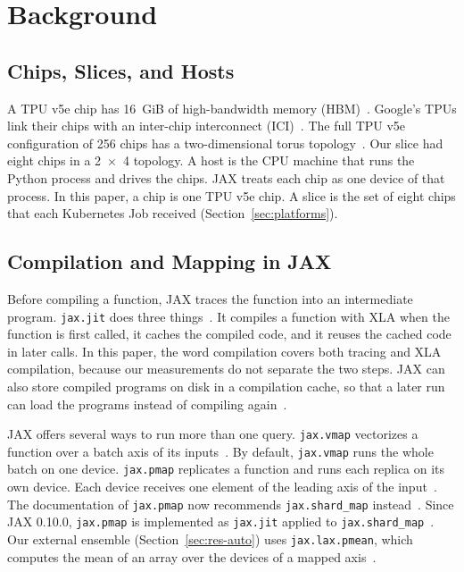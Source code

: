 \section{Background}\label{sec:background}

\subsection{Chips, Slices, and Hosts}\label{sec:bg-tpu}
A TPU v5e chip has 16~GiB of high-bandwidth memory (HBM)~\cite{googletpuv5e}. %
Google's TPUs link their chips with an inter-chip interconnect (ICI)~\cite{jouppi2020domain}.
The full TPU v5e configuration of 256 chips has a two-dimensional torus topology~\cite{googletpuv5e}. %
Our slice had eight chips in a 2~$\times$~4 topology. %
A host is the CPU machine that runs the Python process and drives the chips. JAX treats each chip as one device of that
process. In this paper, a chip is one TPU v5e chip. A slice is the set of eight chips that each Kubernetes Job received
(Section~\ref{sec:platforms}).

\subsection{Compilation and Mapping in JAX}\label{sec:bg-jax}
Before compiling a function, JAX traces the function into an intermediate program.
\texttt{jax.jit} does three things~\cite{jaxjit}. It compiles a function with XLA when the function is first called, it caches the compiled code, and it reuses the cached code in later calls.
In this paper, the word compilation covers both tracing and XLA compilation, because our measurements do not separate the two steps.
JAX can also store compiled programs on disk in a compilation cache, so that a later run can load the programs instead of compiling again~\cite{jaxcache}.

JAX offers several ways to run more than one query. \texttt{jax.vmap} vectorizes a function over a batch axis of its
inputs~\cite{jaxvmap}. By default, \texttt{jax.vmap} runs the whole batch on one device.
\texttt{jax.pmap} replicates
a function and runs each replica on its own device. Each device receives one element of the leading axis of the
input~\cite{jaxpmap}. The documentation of \texttt{jax.pmap} now recommends \texttt{jax.shard\_map}
instead~\cite{jaxpmap}.
Since JAX 0.10.0, \texttt{jax.pmap} is implemented as \texttt{jax.jit} applied to \texttt{jax.shard\_map}~\cite{jaxchangelog}. %
Our external ensemble (Section~\ref{sec:res-auto}) uses \texttt{jax.lax.pmean}, which computes the mean of an array over
the devices of a mapped axis~\cite{jaxpmean}.

